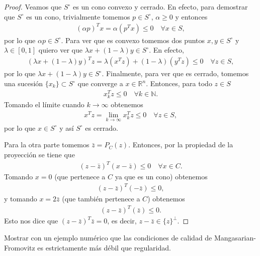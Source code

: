 \documentclass{article}
\newcommand{\R}{\mathbb{R}}
\newcommand{\N}{\mathbb{N}}
\newenvironment{theorem}[2][Ejercicio]{\begin{trivlist}
\item[\hskip \labelsep {\bfseries #1}\hskip \labelsep {\bfseries #2.}]}{\end{trivlist}}
\begin{document}
\begin{proof}
    Veamos que \( S^{\circ} \) es un cono convexo y cerrado. En efecto, para demostrar que \( S^{\circ} \) es un cono, trivialmente tomemos \( p \in S^{\circ} \), \( \alpha \geq 0 \) y entonces
    \begin{align*}
        (\alpha p)^T x = \alpha (p^T x) \leq 0 \quad \forall x \in S,
    \end{align*}
    por lo que \( \alpha p \in S^{\circ} \).
    Para ver que es convexo tomemos dos puntos \( x, y \in S^{\circ} \) y \( \lambda \in [0, 1] \) quiero ver que \( \lambda x + (1 - \lambda) y \in S^{\circ} \).
    En efecto, \begin{align*}
        (\lambda x + (1 - \lambda) y)^T z = \lambda (x^T z) + (1 - \lambda) (y^T z) \leq 0 \quad \forall z \in S,
    \end{align*}
    por lo que \( \lambda x + (1 - \lambda) y \in S^{\circ} \).
    Finalmente, para ver que es cerrado, tomemos una sucesión \( \{ x_k \} \subset S^{\circ} \) que converge a \( x \in \R^n \). Entonces, para todo \( z \in S \)
    \begin{align*}
        x_k^T z \leq 0 \quad \forall k \in \N.
    \end{align*}
    Tomando el límite cuando \( k \to \infty \) obtenemos \begin{align*}
        x^T z = \lim_{k \to \infty} x_k^T z \leq 0 \quad \forall z \in S,
    \end{align*}
    por lo que \( x \in S^{\circ} \) y así \( S^{\circ} \) es cerrado.

    Para la otra parte tomemos \( \bar{z} = P_C(z) \). Entonces, por la propiedad de la proyección se tiene que \begin{align*}
        {(z - \bar{z})}^T (x - \bar{z}) \leq 0 \quad \forall x \in C.
    \end{align*}
    Tomando \( x = 0 \) (que pertenece a \( C \) ya que es un cono) obtenemos \begin{align*}
        {(z - \bar{z})}^T (- \bar{z}) \leq 0,
    \end{align*}
    y tomando \( x = 2 \bar{z} \) (que también pertenece a \( C \)) obtenemos \begin{align*}
        {(z - \bar{z})}^T (\bar{z}) \leq 0.
    \end{align*}
    Esto nos dice que \( {(z - \bar{z})}^T \bar{z} = 0 \), es decir, \( z - \bar{z} \in {\{ z \}}^{\perp} \).
\end{proof}

\begin{theorem}{6}
    Mostrar con un ejemplo numérico que las condiciones de calidad de Mangasarian-Fromovitz es estrictamente más débil que regularidad.
\end{theorem}
\end{document}

